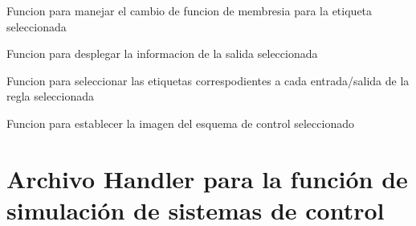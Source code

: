 \documentclass[letterpaper,10pt,spanish]{sphinxmanual}
\begin{document}
\begin{fulllineitems}
\label{\detokenize{codigos/FuzzyHandler:FuzzyHandler.seleccion_mf_out}}
Funcion para manejar el cambio de funcion de membresia para la etiqueta seleccionada

\end{fulllineitems}


\begin{fulllineitems}
\label{\detokenize{codigos/FuzzyHandler:FuzzyHandler.seleccion_salida}}
Funcion para desplegar la informacion de la salida seleccionada

\end{fulllineitems}


\begin{fulllineitems}
\label{\detokenize{codigos/FuzzyHandler:FuzzyHandler.seleccionar_etiquetas}}
Funcion para seleccionar las etiquetas correspodientes a cada entrada/salida de la regla seleccionada

\end{fulllineitems}


\begin{fulllineitems}
\label{\detokenize{codigos/FuzzyHandler:FuzzyHandler.show_esquema}}
Funcion para establecer la imagen del esquema de control seleccionado

\end{fulllineitems}



\section{Archivo Handler para la función de simulación de sistemas de control}
\label{\detokenize{codigos/simulacionHandler:archivo-handler-para-la-funcion-de-simulacion-de-sistemas-de-control}}\label{\detokenize{codigos/simulacionHandler::doc}}
\end{document}
